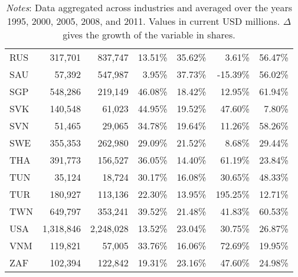 \documentclass[a4paper,11pt]{article}
\begin{document}
\begin{table}[h]
\begin{tabular}{lrrrrrr}
    RUS   & 317,701 & 837,747 & 13.51\% & 35.62\% & 3.61\% & 56.47\% \\
    SAU   & 57,392 & 547,987 & 3.95\% & 37.73\% & -15.39\% & 56.02\% \\
    SGP   & 548,286 & 219,149 & 46.08\% & 18.42\% & 12.95\% & 61.94\% \\
    SVK   & 140,548 & 61,023 & 44.95\% & 19.52\% & 47.60\% & 7.80\% \\
    SVN   & 51,465 & 29,065 & 34.78\% & 19.64\% & 11.26\% & 58.26\% \\
    SWE   & 355,353 & 262,980 & 29.09\% & 21.52\% & 8.68\% & 29.44\% \\
    THA   & 391,773 & 156,527 & 36.05\% & 14.40\% & 61.19\% & 23.84\% \\
    TUN   & 35,124 & 18,724 & 30.17\% & 16.08\% & 30.65\% & 48.33\% \\
    TUR   & 180,927 & 113,136 & 22.30\% & 13.95\% & 195.25\% & 12.71\% \\
    TWN   & 649,797 & 353,241 & 39.52\% & 21.48\% & 41.83\% & 60.53\% \\
    USA   & 1,318,846 & 2,248,028 & 13.52\% & 23.04\% & 30.75\% & 26.87\% \\
    VNM   & 119,821 & 57,005 & 33.76\% & 16.06\% & 72.69\% & 19.95\% \\
    ZAF   & 102,394 & 122,842 & 19.31\% & 23.16\% & 47.60\% & 24.98\% \\
    \bottomrule
    \end{tabular}
      \caption*{\textit{Notes}: Data aggregated across industries and averaged over the years 1995, 2000, 2005, 2008, and 2011. Values in current USD millions. $\Delta$ gives the growth of the variable in shares.}
  \label{tab:gvc_k}
\end{table}
\vspace*{\fill}

\newpage

\vspace*{\fill}
\end{document}
